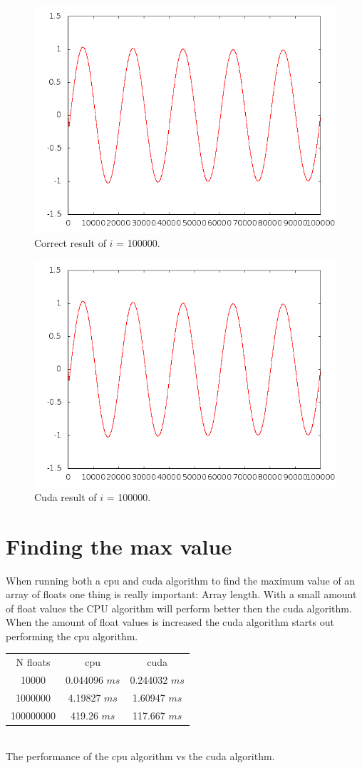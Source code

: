 \documentclass[10pt]{article}
\begin{document}
\begin{figure}[h]
  \centering
    \includegraphics[width=\textwidth]{assign1_100000.png}
  \caption{Correct result of $i$ = 100000.}
\end{figure}
\break
\begin{figure}[h]
  \centering
    \includegraphics[width=\textwidth]{assign4_100000.png}
  \caption{Cuda result of $i$ = 100000.}
\end{figure}
\break


\section{Finding the max value}
When running both a cpu and cuda algorithm to find the maximum value of an array of floats one thing is really important: Array length. With a small amount of float values the CPU algorithm will perform better then the cuda algorithm. When the amount of float values is increased the cuda algorithm starts out performing the cpu algorithm. 
\\


\begin{tabular}{c | c | c}
N floats & cpu & cuda \\
10000 & 0.044096 $ms$ & 0.244032 $ms$ \\
1000000 & 4.19827 $ms$ & 1.60947 $ms$ \\
100000000 & 419.26 $ms$ & 117.667 $ms$\\
\end{tabular}
\\
The performance of the cpu algorithm vs the cuda algorithm. 
\end{document}
